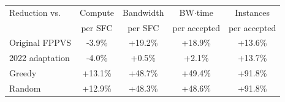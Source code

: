 \begin{tabular}{lcccc}
\toprule
Reduction vs. & Compute & Bandwidth & BW$\cdot$time & Instances \\
 & per SFC & per SFC & per accepted & per accepted \\
\midrule
Original FPPVS & -3.9\% & +19.2\% & +18.9\% & +13.6\% \\
2022 adaptation & -4.0\% & +0.5\% & +2.1\% & +13.7\% \\
Greedy & +13.1\% & +48.7\% & +49.4\% & +91.8\% \\
Random & +12.9\% & +48.3\% & +48.6\% & +91.8\% \\
\bottomrule
\end{tabular}